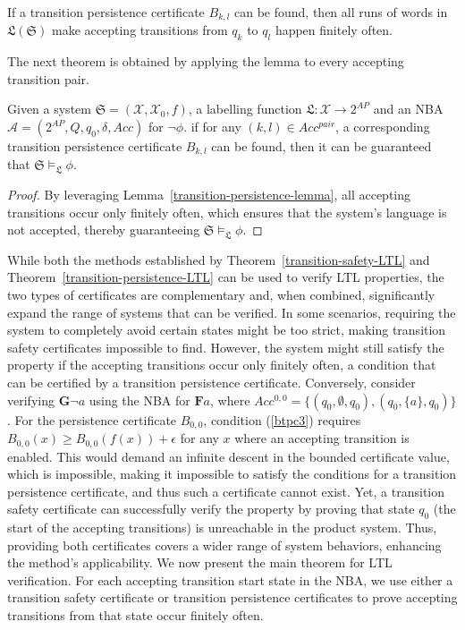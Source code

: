 \begin{lemma}
  \label{transition-persistence-lemma}
  If a transition persistence certificate $B_{k,l}$ can be found, then all runs of words in $\mathfrak{L}(\mathfrak{S})$ make accepting transitions from $q_k$ to $q_l$ happen finitely often.
\end{lemma}

The next theorem is obtained by applying the lemma to every accepting transition pair.

\begin{theorem}
  \label{transition-persistence-LTL}
  Given a system $\mathfrak{S} = (\mathcal{X}, \mathcal{X}_0, f)$, a labelling function $\mathfrak{L}:\mathcal{X} \rightarrow 2^{AP}$ and an NBA $\mathcal{A} = (2^{AP}, Q, q_0, \delta, Acc)$ for $\neg\phi$. if for any $(k, l) \in Acc^{pair}$, a corresponding transition persistence certificate $B_{k,l}$ can be found, then it can be guaranteed that $\mathfrak{S} \models_{\mathfrak{L}} \phi$.
\end{theorem}

\begin{proof}
By leveraging Lemma~\ref{transition-persistence-lemma}, all accepting transitions occur only finitely often, which ensures that the system's language is not accepted, thereby guaranteeing $\mathfrak{S} \models_{\mathfrak{L}} \phi$.
\end{proof}

While both the methods established by Theorem~\ref{transition-safety-LTL} and Theorem~\ref{transition-persistence-LTL} can be used to verify LTL properties, the two types of certificates are complementary and, when combined, significantly expand the range of systems that can be verified. In some scenarios, requiring the system to completely avoid certain states might be too strict, making transition safety certificates impossible to find. However, the system might still satisfy the property if the accepting transitions occur only finitely often, a condition that can be certified by a transition persistence certificate. Conversely, consider verifying $\mathbf{G} \neg a$ using the NBA for $\mathbf{F} a$, where $Acc^{0,0} = \{(q_0, \emptyset, q_0), (q_0, \{a\}, q_0)\}$. For the persistence certificate $B_{0,0}$, condition (\ref{btpc3}) requires $B_{0,0}(x) \geq B_{0,0}(f(x)) + \epsilon$ for any $x$ where an accepting transition is enabled. This would demand an infinite descent in the bounded certificate value, which is impossible, making it impossible to satisfy the conditions for a transition persistence certificate, and thus such a certificate cannot exist. Yet, a transition safety certificate can successfully verify the property by proving that state $q_0$ (the start of the accepting transitions) is unreachable in the product system. Thus, providing both certificates covers a wider range of system behaviors, enhancing the method's applicability. We now present the main theorem for LTL verification. For each accepting transition start state in the NBA, we use either a transition safety certificate or transition persistence certificates to prove accepting transitions from that state occur finitely often.


